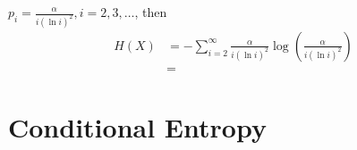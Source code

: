 \documentclass{report}
\theoremstyle{definition}
\theoremstyle{remark}
\numberwithin{equation}{section}
\begin{document}
$p_i = \frac{\alpha}{i(\ln i)^2}, i = 2, 3, \ldots$, then \begin{align*}
  H(X) & = -\sum_{i=2}^\infty \frac{\alpha}{i(\ln i)^2} \log \left(\frac{\alpha}{i(\ln i)^2}\right) \\
  & = 
\end{align*}

\section{Conditional Entropy}
\end{document}
